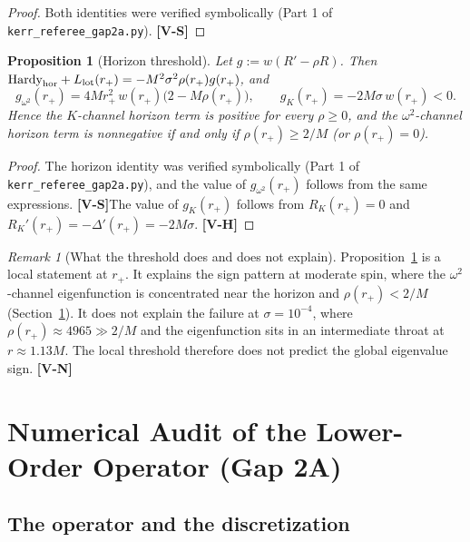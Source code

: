 \documentclass[11pt, a4paper]{article}
\newcommand{\VS}{\textcolor{vs}{\textbf{[V-S]}}}
\newcommand{\VN}{\textcolor{vn}{\textbf{[V-N]}}}
\newcommand{\VH}{\textcolor{vh}{\textbf{[V-H]}}}
\newtheorem{proposition}[theorem]{Proposition}
\theoremstyle{remark}
\newtheorem{remark}[theorem]{Remark}
\theoremstyle{definition}
\begin{document}
\begin{proof}
Both identities were verified symbolically (Part 1 of \texttt{kerr\_referee\_gap2a.py}). \VS
\end{proof}

\begin{proposition}[Horizon threshold]
\label{prop:horizon}
Let $g := w(R' - \rho R)$. Then $\mathrm{Hardy}_{\rm hor} + L_{\rm lot}(r_+) = -M^2\sigma^2\rho(r_+)g(r_+)$, and
\[
g_{\omega^2}(r_+) = 4Mr_+^2\,w(r_+)\bigl(2 - M\rho(r_+)\bigr), \qquad g_K(r_+) = -2M\sigma\,w(r_+) < 0.
\]
Hence the $K$-channel horizon term is positive for every $\rho\ge0$, and the $\omega^2$-channel horizon term is nonnegative if and only if $\rho(r_+) \ge 2/M$ (or $\rho(r_+) = 0$).
\end{proposition}

\begin{proof}
The horizon identity was verified symbolically (Part 1 of \texttt{kerr\_referee\_gap2a.py}), and the value of $g_{\omega^2}(r_+)$ follows from the same expressions. \VS The value of $g_K(r_+)$ follows from $R_K(r_+) = 0$ and $R_K'(r_+) = -\Delta'(r_+) = -2M\sigma$. \VH
\end{proof}

\begin{remark}[What the threshold does and does not explain]
Proposition~\ref{prop:horizon} is a local statement at $r_+$. It explains the sign pattern at moderate spin, where the $\omega^2$-channel eigenfunction is concentrated near the horizon and $\rho(r_+) < 2/M$ (Section~\ref{sec:gap2a}). It does not explain the failure at $\sigma = 10^{-4}$, where $\rho(r_+) \approx 4965 \gg 2/M$ and the eigenfunction sits in an intermediate throat at $r \approx 1.13M$. The local threshold therefore does not predict the global eigenvalue sign. \VN
\end{remark}

\section{Numerical Audit of the Lower-Order Operator (Gap 2A)}
\label{sec:gap2a}

\subsection{The operator and the discretization}
\end{document}
